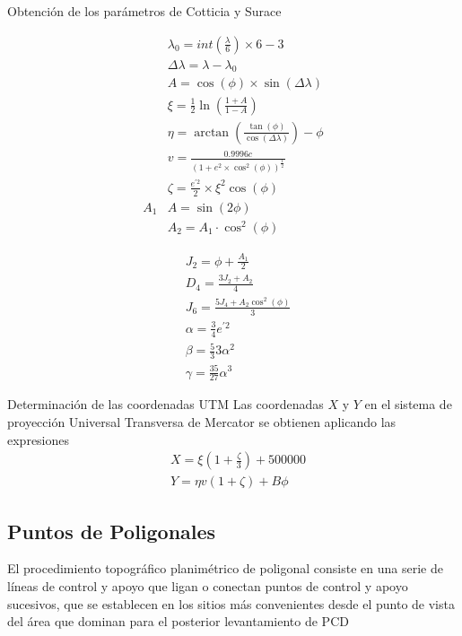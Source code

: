 Obtención de los parámetros de Cotticia y Surace

\begin{align}
    &\lambda_0=int\left(\frac{\lambda}{6}\right)\times 6-3\\
    &\Delta \lambda=\lambda-\lambda_0\\
    &A=\cos{(\phi)}\times \sin{(\Delta \lambda)}\\
    &\xi=\frac{1}{2}\ln{\left(\frac{1+A}{1-A}\right)}\\
    &\eta=\arctan{\left(\frac{\tan{(\phi)}}{\cos{(\Delta\lambda)}}\right)}-\phi\\
    &v=\frac{0.9996c}{\left(1+e^2\times \cos^2{(\phi)}\right)^{\frac{1}{2}}}\\
    &\zeta=\frac{e^{\prime 2}}{2}\times\xi^2\cos{(\phi)}\\A_1
    &A=\sin{(2\phi)}\\
    &A_2=A_1\cdot\cos^2{(\phi)}
\end{align}

\begin{align}
    &J_2=\phi+\frac{A_1}{2}\\
    &D_4=\frac{3J_2+A_2}{4}\\
    &J_6=\frac{5J_4+A_2\cos^2{(\phi)}}{3}\\
    &\alpha=\frac{3}{4}e^{\prime 2}\\
    &\beta=\frac{5}{3}3\alpha^2\\
    &\gamma=\frac{35}{27}\alpha^{3}
\end{align}

Determinación de las coordenadas UTM Las coordenadas $X$ y $Y$ en el sistema de proyección Universal Transversa de Mercator se obtienen aplicando las expresiones
\begin{align}
    &X=\xi \left(1+\frac{\zeta}{3}\right)+500000\\
    &Y=\eta v(1+\zeta)+B\phi
\end{align}

\subsection{Puntos de Poligonales}

El procedimiento topográfico planimétrico de poligonal consiste en una serie de líneas de control y apoyo que ligan o conectan puntos de control y apoyo sucesivos, que se establecen en los sitios más convenientes desde el punto de vista del área que dominan para el posterior levantamiento de PCD

